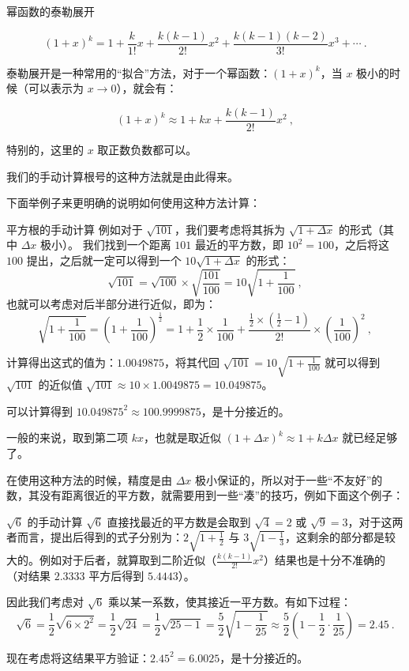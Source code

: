 

\begin{theorem}{幂函数的泰勒展开}

$$(1+x)^k =  1 + \frac{k}{1!} x + \frac{k(k-1)}{2!} x^2 + \frac{k(k-1)(k-2)}{3!} x^3 + \cdots~.$$

\end{theorem}

泰勒展开是一种常用的“拟合”方法，对于一个幂函数：$\left(1+x\right) ^k$，当 $x$ 极小的时候（可以表示为 $x \rightarrow 0$），就会有：

$$(1+x)^k \approx 1 + kx + \frac{k(k-1)}{2!}x^2 ~,$$

特别的，这里的 $x$ 取正数负数都可以。

我们的手动计算根号的这种方法就是由此得来。

下面举例子来更明确的说明如何使用这种方法计算：
\begin{example}{平方根的手动计算}
例如对于 $\sqrt{101}$，我们要考虑将其拆为 $\sqrt{1+ \Delta x}$ 的形式（其中 $\Delta x$ 极小）。
我们找到一个距离 $101$ 最近的平方数，即 $10^2 = 100$，之后将这 $100$ 提出，之后就一定可以得到一个 $10 \sqrt{1 + \Delta x}$ 的形式：
$$\sqrt{101} = \sqrt{100} \times \sqrt{\frac{101}{100}}  = 10 \sqrt{1+\frac{1}{100}}~,$$
也就可以考虑对后半部分进行近似，即为：
$$\sqrt{1 + \frac 1{100}} = \left(1 + \frac 1{100}\right)^{\frac 1 2} = 1 + \frac 12 \times \frac 1{100} + \frac{\frac 12 \times (\frac 12 - 1)}{2!} \times \left(\frac 1{100}\right)^2~,$$

计算得出这式的值为：$1.0049875$，将其代回 $\sqrt{101} = 10 \sqrt{1+\frac{1}{100}}$ 就可以得到 $\sqrt{101}$ 的近似值 $\sqrt{101} \approx 10 \times 1.0049875 = 10.049875$。

可以计算得到 $10.049875^2 \approx 100.9999875$，是十分接近的。
\end{example}

一般的来说，取到第二项 $kx$，也就是取近似 $\left(1+\Delta x\right)^k \approx 1 + k \Delta x $ 就已经足够了。

在使用这种方法的时候，精度是由 $\Delta x$ 极小保证的，所以对于一些“不友好”的数，其没有距离很近的平方数，就需要用到一些“凑”的技巧，例如下面这个例子：
\begin{example}{$\sqrt{6}$ 的手动计算}
$\sqrt{6}$ 直接找最近的平方数是会取到 $\sqrt{4}=2$ 或 $\sqrt{9}=3$，对于这两者而言，提出后得到的式子分别为：$2\sqrt{1 + \frac 12}$ 与 $3 \sqrt{1 - \frac 13}$，这剩余的部分都是较大的。例如对于后者，就算取到二阶近似（$\frac{k(k-1)}{2!} x^2$）结果也是十分不准确的（对结果 $2.3333$ 平方后得到 $5.4443$）。

因此我们考虑对 $\sqrt{6}$ 乘以某一系数，使其接近一平方数。有如下过程：
$$\sqrt{6} = \frac 12 \sqrt{6 \times 2^2} = \frac 12 \sqrt{24} = \frac 12 \sqrt{25 - 1} = \frac52 \sqrt{1 - \frac 1{25}} \approx \frac 52 \left(1 - \frac 12 \cdot \frac 1{25}\right) = 2.45~.$$

现在考虑将这结果平方验证：$2.45^2 = 6.0025$，是十分接近的。
\end{example}
